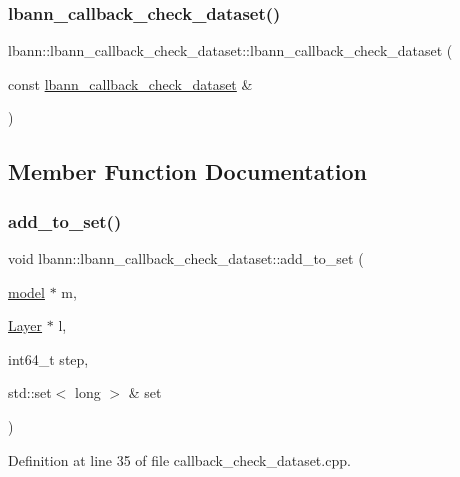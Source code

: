\subsubsection{\texorpdfstring{lbann\+\_\+callback\+\_\+check\+\_\+dataset()}{lbann\_callback\_check\_dataset()}\hspace{0.1cm}{\footnotesize\ttfamily [2/2]}}
{\footnotesize\ttfamily lbann\+::lbann\+\_\+callback\+\_\+check\+\_\+dataset\+::lbann\+\_\+callback\+\_\+check\+\_\+dataset (\begin{DoxyParamCaption}\item[{const \hyperlink{classlbann_1_1lbann__callback__check__dataset}{lbann\+\_\+callback\+\_\+check\+\_\+dataset} \&}]{ }\end{DoxyParamCaption})\hspace{0.3cm}{\ttfamily [default]}}



\subsection{Member Function Documentation}
\mbox{\label{classlbann_1_1lbann__callback__check__dataset_a17aff74d9926e07bfa1f090ad39bb4b6}} 
\subsubsection{\texorpdfstring{add\+\_\+to\+\_\+set()}{add\_to\_set()}}
{\footnotesize\ttfamily void lbann\+::lbann\+\_\+callback\+\_\+check\+\_\+dataset\+::add\+\_\+to\+\_\+set (\begin{DoxyParamCaption}\item[{\hyperlink{classlbann_1_1model}{model} $\ast$}]{m,  }\item[{\hyperlink{classlbann_1_1Layer}{Layer} $\ast$}]{l,  }\item[{int64\+\_\+t}]{step,  }\item[{std\+::set$<$ long $>$ \&}]{set }\end{DoxyParamCaption})}



Definition at line 35 of file callback\+\_\+check\+\_\+dataset.\+cpp.


